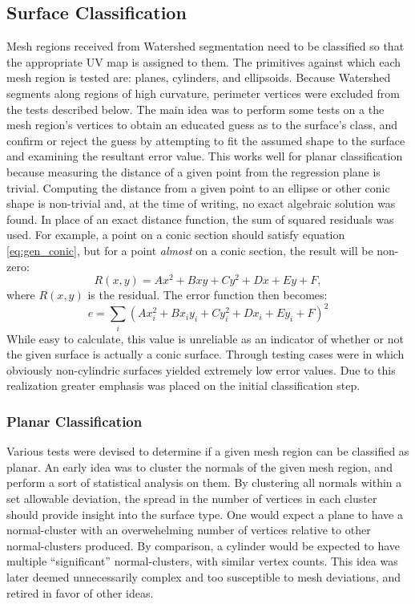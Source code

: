 \subsection{Surface Classification}
Mesh regions received from Watershed segmentation need to be classified so that the appropriate UV map is assigned to them.
The primitives against which each mesh region is tested are: planes, cylinders, and ellipsoids.
Because Watershed segments along regions of high curvature, perimeter vertices were excluded from the tests described below.
The main idea was to perform some tests on a the mesh region's vertices to obtain an educated guess as to the surface's class, and confirm or reject the guess by attempting to fit the assumed shape to the surface and examining the resultant error value.
This works well for planar classification because measuring the distance of a given point from the regression plane is trivial.
Computing the distance from a given point to an ellipse or other conic shape is non-trivial and, at the time of writing, no exact algebraic solution was found.
In place of an exact distance function, the sum of squared residuals was used.
For example, a point on a conic section should satisfy equation \ref{eq:gen_conic}, but for a point \textit{almost} on a conic section, the result will be non-zero:
\begin{equation}
	R(x,y) = Ax^2 + Bxy + Cy^2 + Dx + Ey + F,
\end{equation}
where $R(x,y)$ is the residual. The error function then becomes:
\begin{equation}
	e = \sum_i \left(Ax_i^2 + Bx_i y_i + Cy_i^2 + Dx_i + Ey_i + F\right)^2
\end{equation}
While easy to calculate, this value is unreliable as an indicator of whether or not the given surface is actually a conic surface.
Through testing cases were in which obviously non-cylindric surfaces yielded extremely low error values.
Due to this realization greater emphasis was placed on the initial classification step.

\subsubsection{Planar Classification}
Various tests were devised to determine if a given mesh region can be classified as planar.
An early idea was to cluster the normals of the given mesh region, and perform a sort of statistical analysis on them.
By clustering all normals within a set allowable deviation, the spread in the number of vertices in each cluster should provide insight into the surface type.
One would expect a plane to have a normal-cluster with an overwehelming number of vertices relative to other normal-clusters produced.
By comparison, a cylinder would be expected to have multiple ``significant'' normal-clusters, with similar vertex counts.
This idea was later deemed unnecessarily complex and too susceptible to mesh deviations, and retired in favor of other ideas.

